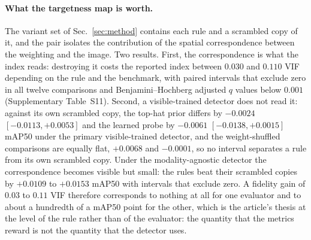 \documentclass[10pt,a4paper]{article}
\begin{document}
\begin{sloppypar}
\paragraph{What the targetness map is worth.} The variant set of
Sec.~\ref{sec:method} contains each rule and a scrambled copy of it, and the pair
isolates the contribution of the spatial correspondence between the weighting and the
image. Two results. First, the correspondence is what the index reads: destroying it
costs the reported index between $0.030$ and $0.110$ VIF depending on the rule and the
benchmark, with paired intervals that exclude zero in all twelve comparisons and
Benjamini--Hochberg adjusted $q$ values below $0.001$ (Supplementary Table~S11). Second,
a visible-trained detector does not read it: against its own scrambled copy, the
top-hat prior differs by $-0.0024$ $[-0.0113,+0.0053]$ and the learned probe by
$-0.0061$ $[-0.0138,+0.0015]$ mAP50 under the primary visible-trained detector, and the
weight-shuffled comparisons are equally flat, $+0.0068$ and $-0.0001$, so no interval
separates a rule from its own scrambled copy. Under the modality-agnostic detector the
correspondence becomes visible but small: the rules beat their scrambled copies by
$+0.0109$ to $+0.0153$ mAP50 with intervals that exclude zero. A fidelity gain of
$0.03$ to $0.11$ VIF therefore corresponds to nothing at all for one evaluator and to
about a hundredth of a mAP50 point for the other, which is the article's thesis at the
level of the rule rather than of the evaluator: the quantity that the metrics reward
is not the quantity that the detector uses.


\end{sloppypar}
\end{document}
